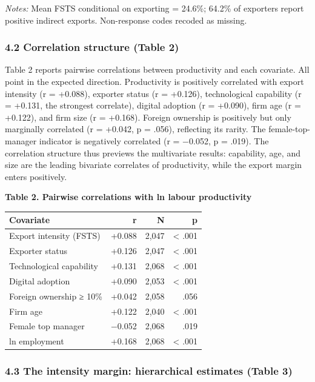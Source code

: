 \documentclass[
  12pt,a4paper]{article}
\begin{document}
\emph{Notes:} Mean FSTS conditional on exporting = 24.6\%; 64.2\% of
exporters report positive indirect exports. Non-response codes recoded
as missing.

\hypertarget{correlation-structure-table-2}{%
\subsubsection{4.2 Correlation structure (Table
2)}\label{correlation-structure-table-2}}

Table 2 reports pairwise correlations between productivity and each
covariate. All point in the expected direction. Productivity is
positively correlated with export intensity (r = +0.088), exporter
status (r = +0.126), technological capability (r = +0.131, the strongest
correlate), digital adoption (r = +0.090), firm age (r = +0.122), and
firm size (r = +0.168). Foreign ownership is positively but only
marginally correlated (r = +0.042, p = .056), reflecting its rarity. The
female-top-manager indicator is negatively correlated (r = −0.052, p =
.019). The correlation structure thus previews the multivariate results:
capability, age, and size are the leading bivariate correlates of
productivity, while the export margin enters positively.

\textbf{Table 2. Pairwise correlations with ln labour productivity}

\begin{longtable}[]{@{}lrrr@{}}
\toprule\noalign{}
Covariate & r & N & p \\
\midrule\noalign{}
\endhead
\bottomrule\noalign{}
\endlastfoot
Export intensity (FSTS) & +0.088 & 2,047 & \textless{} .001 \\
Exporter status & +0.126 & 2,047 & \textless{} .001 \\
Technological capability & +0.131 & 2,068 & \textless{} .001 \\
Digital adoption & +0.090 & 2,053 & \textless{} .001 \\
Foreign ownership ≥ 10\% & +0.042 & 2,058 & .056 \\
Firm age & +0.122 & 2,040 & \textless{} .001 \\
Female top manager & −0.052 & 2,068 & .019 \\
ln employment & +0.168 & 2,068 & \textless{} .001 \\
\end{longtable}

\hypertarget{the-intensity-margin-hierarchical-estimates-table-3}{%
\subsubsection{4.3 The intensity margin: hierarchical estimates (Table
3)}\label{the-intensity-margin-hierarchical-estimates-table-3}}
\end{document}
